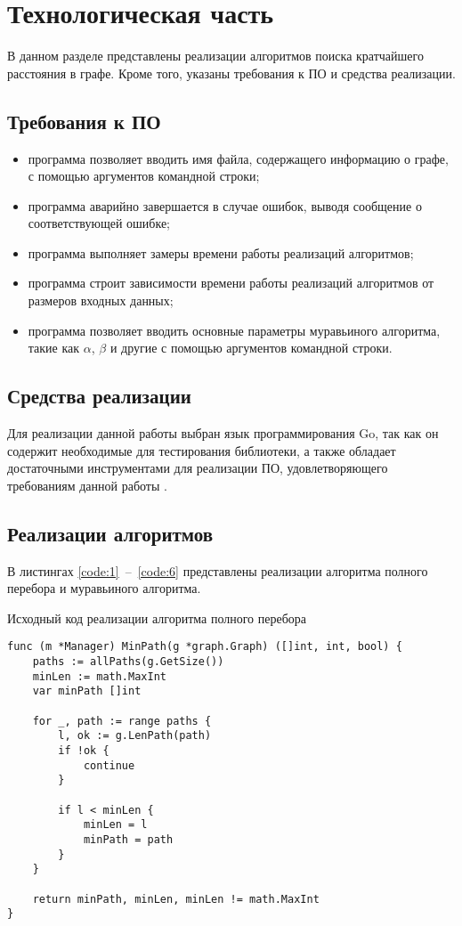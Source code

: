 \chapter{Технологическая часть}

В данном разделе представлены реализации алгоритмов поиска кратчайшего расстояния в графе. Кроме того, указаны требования к ПО и средства реализации.

\section{Требования к ПО}
\begin{itemize}
	\item программа позволяет вводить имя файла, содержащего информацию о графе, с помощью аргументов командной строки;
	\item программа аварийно завершается в случае ошибок, выводя сообщение о соответствующей ошибке;
	\item программа выполняет замеры времени работы реализаций алгоритмов;
	\item программа строит зависимости времени работы реализаций алгоритмов от размеров входных данных;
	\item программа позволяет вводить основные параметры муравьиного алгоритма, такие как $\alpha$, $\beta$ и другие с помощью аргументов командной строки.
\end{itemize}

\section{Средства реализации}
Для реализации данной работы выбран язык программирования Go, так как он содержит необходимые для тестирования библиотеки, а также обладает достаточными инструментами для реализации ПО, удовлетворяющего требованиям данной работы \cite{bib:3}.

\section{Реализации алгоритмов}
В листингах \ref{code:1}~--~\ref{code:6} представлены реализации алгоритма полного перебора и муравьиного алгоритма.

\newpage

\begin{code}
\caption{Исходный код реализации алгоритма полного перебора}
\label{code:1}
\begin{verbatim}
func (m *Manager) MinPath(g *graph.Graph) ([]int, int, bool) {
	paths := allPaths(g.GetSize())
	minLen := math.MaxInt
	var minPath []int

	for _, path := range paths {
		l, ok := g.LenPath(path)
		if !ok {
			continue
		}

		if l < minLen {
			minLen = l
			minPath = path
		}
	}

	return minPath, minLen, minLen != math.MaxInt
}
\end{verbatim}
\end{code}

